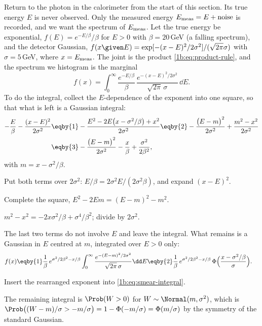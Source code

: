 \label{1b:ex:smearing}
Return to the photon in the calorimeter from the start of this section. Its
true energy $E$ is never observed. Only the measured energy
$E_{\rm meas}=E+\text{noise}$ is recorded, and we want the spectrum of
$E_{\rm meas}$. Let the true energy be exponential,
$f(E)=e^{-E/\beta}/\beta$ for $E>0$ with $\beta=20\,$GeV (a falling
spectrum), and the detector Gaussian,
$f(x\given E)=\exp[-(x-E)^2/2\sigma^2]/(\sqrt{2\pi}\sigma)$ with
$\sigma=5\,$GeV, where $x=E_{\rm meas}$. The joint is the product
\eqref{1b:eq:product-rule}, and the spectrum we histogram is the marginal
\begin{equation}
  f(x)=\int_0^\infty\frac{e^{-E/\beta}}{\beta}\,
  \frac{e^{-(x-E)^2/2\sigma^2}}{\sqrt{2\pi}\,\sigma}\,\dd E .
  \label{1b:eq:smear-integral}
\end{equation}
To do the integral, collect the $E$-dependence of the exponent into one
square, so that what is left is a Gaussian integral:
\begin{align*}
  -\frac{E}{\beta}-\frac{(x-E)^2}{2\sigma^2}
  &\eqby{1} -\frac{E^2-2E\bigl(x-\sigma^2/\beta\bigr)+x^2}{2\sigma^2}
   \eqby{2} -\frac{\bigl(E-m\bigr)^2}{2\sigma^2}+\frac{m^2-x^2}{2\sigma^2}\\
  &\eqby{3} -\frac{\bigl(E-m\bigr)^2}{2\sigma^2}-\frac{x}{\beta}+\frac{\sigma^2}{2\beta^2},
\end{align*}
with $m=x-\sigma^2/\beta$.
\begin{explain}
  \item Put both terms over $2\sigma^2$: $E/\beta=2\sigma^2E/(2\sigma^2\beta)$,
        and expand $(x-E)^2$.
  \item Complete the square, $E^2-2Em=(E-m)^2-m^2$.
  \item $m^2-x^2=-2x\sigma^2/\beta+\sigma^4/\beta^2$; divide by $2\sigma^2$.
\end{explain}
The last two terms do not involve $E$ and leave the integral. What remains is
a Gaussian in $E$ centred at $m$, integrated over $E>0$ only:
\begin{align*}
  f(x)
  &\eqby{1} \frac1\beta\,e^{\sigma^2/2\beta^2-x/\beta}
     \int_0^\infty\frac{e^{-(E-m)^2/2\sigma^2}}{\sqrt{2\pi}\,\sigma}\dd E
   \eqby{2} \frac1\beta\,e^{\sigma^2/2\beta^2-x/\beta}\,
     \Phi\Bigl(\frac{x-\sigma^2/\beta}{\sigma}\Bigr).
\end{align*}
\begin{explain}
  \item Insert the rearranged exponent into \eqref{1b:eq:smear-integral}.
  \item The remaining integral is $\Prob(W>0)$ for $W\sim\Normal(m,\sigma^2)$,
        which is $\Prob\bigl((W-m)/\sigma>-m/\sigma\bigr)=1-\Phi(-m/\sigma)=\Phi(m/\sigma)$
        by the symmetry of the standard Gaussian.
\end{explain}
